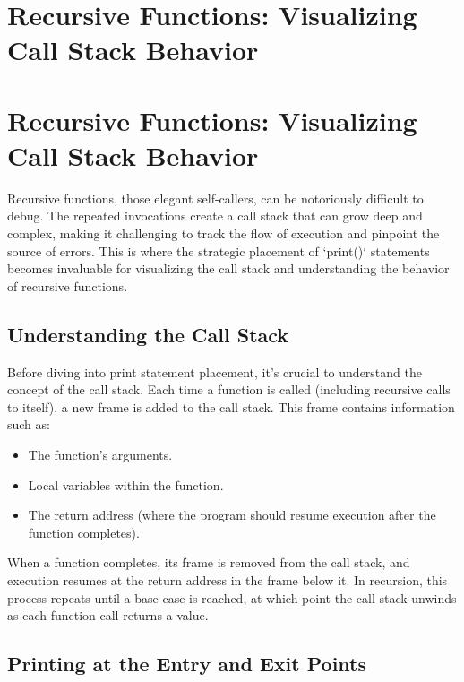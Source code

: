 \documentclass{article}
\begin{document}
{{{%
\newpage

\section*{Recursive Functions: Visualizing Call Stack Behavior} %
\label{chapter-3-7-Recursive_Functions__Visualizing_Call_St}

\section*{Recursive Functions: Visualizing Call Stack Behavior}

Recursive functions, those elegant self-callers, can be notoriously difficult to debug. The repeated invocations create a call stack that can grow deep and complex, making it challenging to track the flow of execution and pinpoint the source of errors. This is where the strategic placement of `print()` statements becomes invaluable for visualizing the call stack and understanding the behavior of recursive functions.

\subsection*{Understanding the Call Stack}

Before diving into print statement placement, it's crucial to understand the concept of the call stack. Each time a function is called (including recursive calls to itself), a new frame is added to the call stack. This frame contains information such as:

\begin{itemize}
    \item The function's arguments.
    \item Local variables within the function.
    \item The return address (where the program should resume execution after the function completes).
\end{itemize}

When a function completes, its frame is removed from the call stack, and execution resumes at the return address in the frame below it.  In recursion, this process repeats until a base case is reached, at which point the call stack unwinds as each function call returns a value.

\subsection*{Printing at the Entry and Exit Points}

}}}
\end{document}

